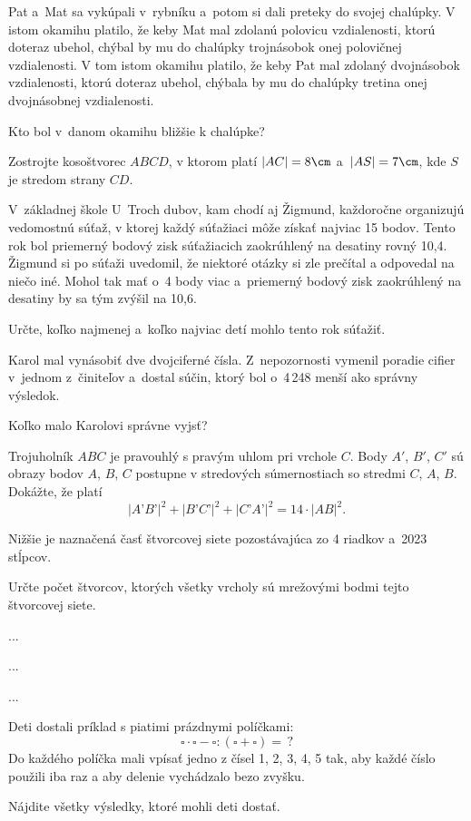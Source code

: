 {%
Pat a~Mat sa vykúpali v~rybníku a~potom si dali preteky do svojej chalúpky.
V istom okamihu platilo, že keby Mat mal zdolanú polovicu vzdialenosti, ktorú doteraz ubehol, chýbal by mu do chalúpky trojnásobok onej polovičnej vzdialenosti.
V tom istom okamihu platilo, že keby Pat mal zdolaný dvojnásobok vzdialenosti, ktorú doteraz ubehol, chýbala by mu do chalúpky tretina onej dvojnásobnej vzdialenosti.

Kto bol v~danom okamihu bližšie k chalúpke?
}

{%
Zostrojte kosoštvorec $ABCD$, v ktorom platí $|AC| = 8\cm$ a~$|AS| = 7\cm$, kde $S$ je stredom strany $CD$.
}

{%
V~základnej škole U~Troch dubov, kam chodí aj Žigmund, každoročne organizujú vedomostnú súťaž, v ktorej každý súťažiaci môže získať najviac 15 bodov.
Tento rok bol priemerný bodový zisk súťažiacich zaokrúhlený na desatiny rovný 10,4.
Žigmund si po súťaži uvedomil, že niektoré otázky si zle prečítal a odpovedal na niečo iné.
Mohol tak mať o~4 body viac a~priemerný bodový zisk zaokrúhlený na desatiny by sa tým zvýšil na 10,6.

Určte, koľko najmenej a~koľko najviac detí mohlo tento rok súťažiť.
}

{%
Karol mal vynásobiť dve dvojciferné čísla.
Z~nepozornosti vymenil poradie cifier v~jednom z~činiteľov a~dostal súčin, ktorý bol o~4\,248 menší ako správny výsledok.

Koľko malo Karolovi správne vyjsť?
}

{%
Trojuholník $ABC$ je pravouhlý s pravým uhlom pri vrchole $C$.
Body $A'$, $B'$, $C'$ sú obrazy bodov $A$, $B$, $C$ postupne v stredových súmernostiach so stredmi $C$, $A$, $B$.
Dokážte, že platí
$$
|A’B’|^2 + |B’C’|^2 + |C’A’|^2 = 14\cdot |AB|^2 .
$$
}

{%
Nižšie je naznačená časť štvorcovej siete pozostávajúca zo 4 riadkov a~2023 stĺpcov.

Určte počet štvorcov, ktorých všetky vrcholy sú mrežovými bodmi tejto štvorcovej siete.
%
}

{%
...}

{%
...}

{%
...}

{%
Deti dostali príklad s piatimi prázdnymi políčkami:
$$
\square \cdot \square - \square : \left( \square + \square \right) =\, ?
$$
Do každého políčka mali vpísať jedno z čísel 1, 2, 3, 4, 5 tak, aby každé číslo použili iba raz a aby delenie vychádzalo bezo zvyšku.

Nájdite všetky výsledky, ktoré mohli deti dostať.}

